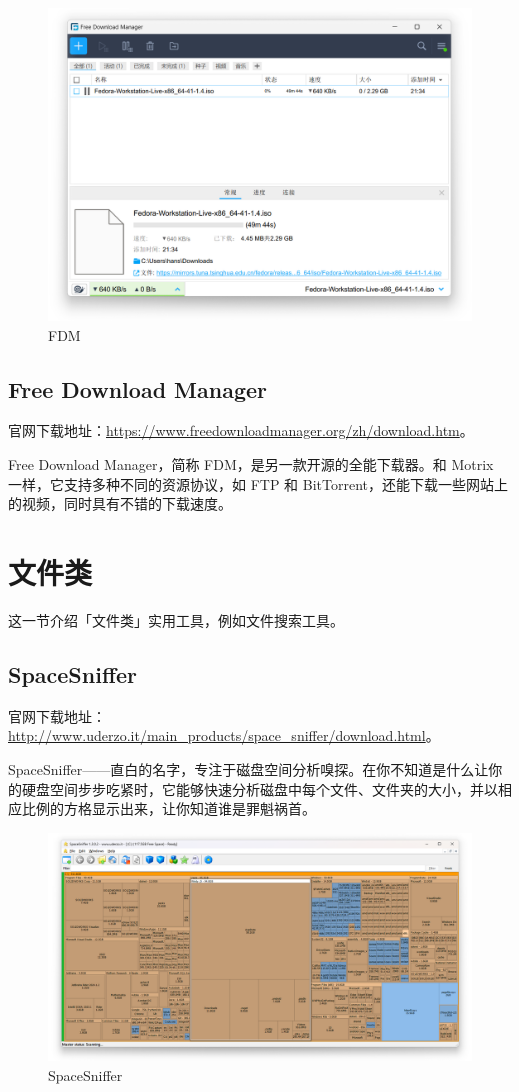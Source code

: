 \begin{figure}[htb!]
  \centering
  \includegraphics[width=.65\textwidth]{assets/software/FDM.png}
  \caption{FDM}
  \label{fig:FDM}
\end{figure}

\subsection{Free Download Manager}

官网下载地址：\url{https://www.freedownloadmanager.org/zh/download.htm}。

Free Download Manager，简称 FDM，是另一款开源的全能下载器。和 Motrix 一样，它支持多种不同的资源协议，如 FTP 和 BitTorrent，还能下载一些网站上的视频，同时具有不错的下载速度。

\section{文件类}

这一节介绍「文件类」实用工具，例如文件搜索工具。

\vspace*{-.5cm}
\subsection{SpaceSniffer}

官网下载地址：\url{http://www.uderzo.it/main_products/space_sniffer/download.html}。

SpaceSniffer——直白的名字，专注于磁盘空间分析嗅探。在你不知道是什么让你的硬盘空间步步吃紧时，它能够快速分析磁盘中每个文件、文件夹的大小，并以相应比例的方格显示出来，让你知道谁是罪魁祸首。

\begin{figure}[htb!]
  \centering
  \includegraphics[width=.75\textwidth]{assets/software/SpaceSniffer.png}
  \caption{SpaceSniffer}
  \label{fig:SpaceSniffer}
\end{figure}

